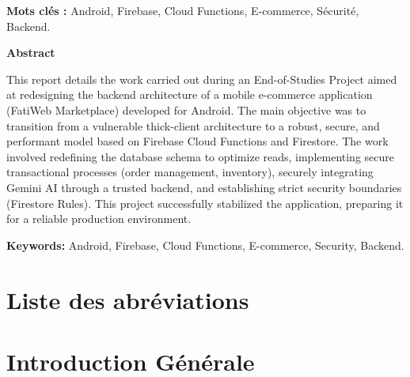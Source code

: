 \documentclass[12pt,a4paper]{report}
\begin{document}
\textbf{Mots clés :} Android, Firebase, Cloud Functions, E-commerce, Sécurité, Backend.

\vspace{1cm}

\begin{center}
\textbf{Abstract}
\end{center}
This report details the work carried out during an End-of-Studies Project aimed at redesigning the backend architecture of a mobile e-commerce application (FatiWeb Marketplace) developed for Android. The main objective was to transition from a vulnerable thick-client architecture to a robust, secure, and performant model based on Firebase Cloud Functions and Firestore. The work involved redefining the database schema to optimize reads, implementing secure transactional processes (order management, inventory), securely integrating Gemini AI through a trusted backend, and establishing strict security boundaries (Firestore Rules). This project successfully stabilized the application, preparing it for a reliable production environment.

\textbf{Keywords:} Android, Firebase, Cloud Functions, E-commerce, Security, Backend.

\clearpage

\tableofcontents
\clearpage

\listoffigures
\clearpage

\listoftables
\clearpage

\chapter*{Liste des abréviations}
\begin{acronym}[Firebase]
\end{acronym}
\clearpage

\chapter*{Introduction Générale}
\end{document}
